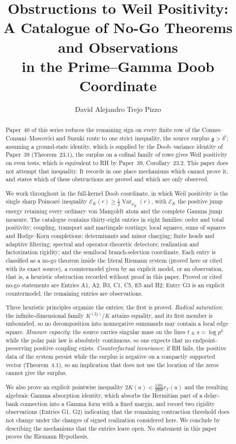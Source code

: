 \documentclass[11pt]{amsart}
\title[Obstructions to Weil positivity]
{Obstructions to Weil Positivity:\\
A Catalogue of No-Go Theorems and Observations\\
in the Prime--Gamma Doob Coordinate}
\author{David Alejandro Trejo Pizzo}
\theoremstyle{definition}
\newcounter{family}
\theoremstyle{remark}
\newcommand{\EK}{\mathscr E_K}
\DeclareMathOperator{\Var}{Var}
\begin{document}
\begin{abstract}
Paper~40 of this series reduces the remaining sign on every finite row of
the Connes--Consani--Moscovici and Suzuki route
\cite{Connes1999,CCM2025,Suzuki2025} to one strict inequality, the source
surplus \(\mathfrak g>\delta^\flat\); assuming a ground-state identity, which is
supplied by the Doob--variance identity of Paper~39 (Theorem~23.1), the
surplus on a cofinal family of rows gives Weil positivity on even tests,
which is equivalent to RH by Paper~39, Corollary~23.2.  This paper does
not attempt that inequality.  It records in one place mechanisms which
cannot prove it, and states which of these obstructions are proved and
which are only observed.

We work throughout in the full-kernel Doob coordinate, in which Weil
positivity is the single sharp Poincar\'e inequality
\(\EK(r)\ge\frac12\Var_{\mu_K}(r)\), with \(\EK\) the positive jump energy
retaining every ordinary von Mangoldt atom and the complete Gamma jump
measure.  The catalogue contains thirty-eight entries in eight families:
order and total positivity; coupling, transport and martingale routings;
local squares, sums of squares and Hodge--Korn completions; determinants
and minor charging; finite heads and adaptive filtering; spectral and
operator-theoretic detectors; realization and factorization rigidity; and
the semilocal branch-selection coordinate.  Each entry is classified as a
no-go theorem inside the literal Riemann system (proved here or cited with
its exact source), a countermodel given by an explicit model, or an
observation, that is, a heuristic obstruction recorded without proof in
this paper.  Proved or cited no-go statements are Entries A1, A2, B3, C1,
C5, E5 and H2; Entry G3 is an explicit countermodel; the remaining entries
are observations.

Three heuristic principles organize the entries; the first is proved.
\emph{Radical
saturation}: the infinite-dimensional family \(K^{(2j)}/K\) attains
equality, and its first member is unbounded, so no decomposition into
nonnegative summands may contain a local edge square.  \emph{Measure
capacity}: the source carries singular mass on the lines
\(t\pm s=\log p^k\) while the polar pair law is absolutely continuous, so
one expects that no endpoint-preserving positive coupling exists.
\emph{Counterfactual invariance}: if RH fails, the positive data of the
system persist while the surplus is negative on a compactly supported vector
(Theorem~4.1), so an implication that does not use the location of the
zeros cannot give the surplus.

We also prove an explicit pointwise inequality
\(2K(u)<\frac{1501}{2000}r_\Gamma(u)\) and the resulting algebraic Gamma
absorption identity, which absorbs the Hermitian part of a delay-bank
connection into a Gamma form with a fixed margin, and record two rigidity
observations (Entries G1, G2) indicating that the remaining contraction
threshold does not change under the changes of signed realization
considered here.  We conclude by describing the mechanisms that the
entries leave open.  No statement in this paper proves the Riemann
Hypothesis.
\end{abstract}
\end{document}
